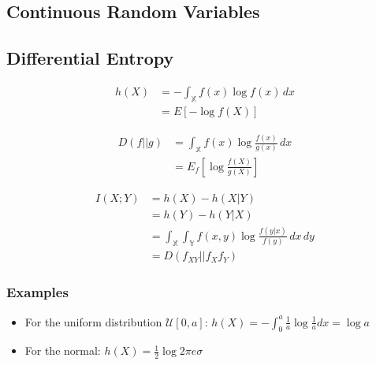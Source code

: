 \documentclass[10pt,a4paper,landscape]{article}
\begin{document}
\begin{multicols*}{4}
\section{Continuous Random Variables}
\subsection{Differential Entropy}
\begin{align*}
h(X) 	& = -\int_\mathbb{X} f(x)\log f(x)\,dx \\
		& = E[-\log f(X)] 
\end{align*}

\begin{align*}
D(f||g) & = \int_\mathbb{X} f(x) \log \frac{f(x)}{g(x)} \, dx \\
	& = E_f[\log \frac{f(X)}{g(X)}]
\end{align*}

\begin{align*}
I(X;Y) 	 & = h(X) - h(X|Y)\\
		& = h(Y) - h(Y|X)\\
		& = \int_\mathbb{X} \int_\mathbb{Y} f(x,y) \log \frac{f(y|x)}{f(y)}\,dx\,dy \\
		& = D(f_{XY} || f_Xf_Y)
\end{align*}


\subsubsection{Examples}
\begin{itemize}
	\item For the uniform distribution $\mathcal{U}[0, a]$:
	$h(X) = - \int_0^a \frac{1}{a} \log \frac{1}{a} dx = \log a$
	\item For the normal:
	$h(X) = \frac{1}{2} \log 2 \pi e \sigma$
\end{itemize}



\end{multicols*}
\end{document}
